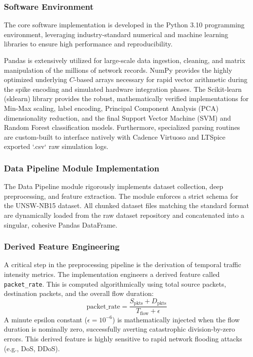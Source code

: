 \documentclass{ieeeaccess}
\begin{document}
\subsubsection{Software Environment}

The core software implementation is developed in the Python 3.10 programming environment, leveraging industry-standard numerical and machine learning libraries to ensure high performance and reproducibility. 

Pandas is extensively utilized for large-scale data ingestion, cleaning, and matrix manipulation of the millions of network records. NumPy provides the highly optimized underlying $C$-based arrays necessary for rapid vector arithmetic during the spike encoding and simulated hardware integration phases. The Scikit-learn (sklearn) library provides the robust, mathematically verified implementations for Min-Max scaling, label encoding, Principal Component Analysis (PCA) dimensionality reduction, and the final Support Vector Machine (SVM) and Random Forest classification models. Furthermore, specialized parsing routines are custom-built to interface natively with Cadence Virtuoso and LTSpice exported `.csv` raw simulation logs.

\subsubsection{Data Pipeline Module Implementation}

The Data Pipeline module rigorously implements dataset collection, deep preprocessing, and feature extraction. The module enforces a strict schema for the UNSW-NB15 dataset. All chunked dataset files matching the standard format are dynamically loaded from the raw dataset repository and concatenated into a singular, cohesive Pandas DataFrame.

\subsubsection{Derived Feature Engineering}
A critical step in the preprocessing pipeline is the derivation of temporal traffic intensity metrics. The implementation engineers a derived feature called \texttt{packet\_rate}. This is computed algorithmically using total source packets, destination packets, and the overall flow duration:
\begin{equation}
\text{packet\_rate}=\frac{S_{\mathrm{pkts}}+D_{\mathrm{pkts}}}{T_{\mathrm{flow}}+\epsilon}
\end{equation}
A minute epsilon constant ($\epsilon = 10^{-6}$) is mathematically injected when the flow duration is nominally zero, successfully averting catastrophic division-by-zero errors. This derived feature is highly sensitive to rapid network flooding attacks (e.g., DoS, DDoS).
\end{document}

